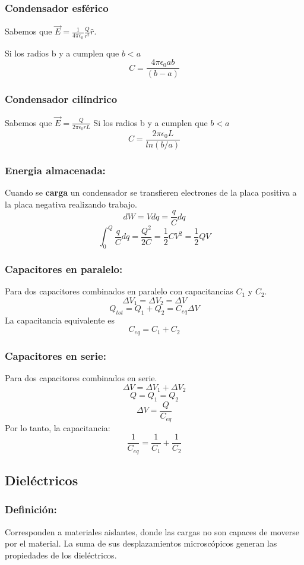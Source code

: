 \documentclass[a4paper, 10pt]{article}
\begin{document}
\begin{multicols*}{2}
	\subsubsection{Condensador esférico}
	Sabemos que $\vec{E} = \frac{1}{4 \pi \epsilon_0} \frac{Q}{r^2}\hat{r}$.

	Si los radios b y a cumplen que $b<a$
	$$C = \frac{4 \pi \epsilon_0 ab}{(b-a)}$$
	    
	\subsubsection{Condensador cilíndrico}
	Sabemos que $\vec{E} = \frac{Q}{2 \pi \epsilon_0 r L}$
	Si los radios b y a cumplen que $b<a$
	$$C = \frac{2 \pi \epsilon_0 L}{ln(b/a)}$$
	    
	\subsubsection{Energia almacenada:}  
  Cuando se \textbf{carga} un condensador se transfieren electrones de la placa positiva a la placa negativa realizando trabajo.
	$$dW = Vdq = \frac{q}{C}dq $$
	$$\int_0^Q \frac{q}{C}dq = \frac{Q^2}{2C} = \frac{1}{2}CV^2 = \frac{1}{2}QV$$
	    
	\subsubsection{Capacitores en paralelo:} Para dos capacitores combinados en paralelo con capacitancias $C_1$ y $C_2$.
	$$\Delta V_1 = \Delta V_2 = \Delta V$$
	$$Q_{tot} = Q_1 + Q_2 =C_{eq} \Delta V$$
	La capacitancia equivalente es
	$$C_{eq}=C_1 + C_2$$
	    
	\subsubsection{Capacitores en serie:} Para dos capacitores combinados en serie.
	$$\Delta V =\Delta V_1 + \Delta V_2 $$
	$$Q = Q_1 = Q_2$$
	$$\Delta V = \frac{Q}{C_{eq}}$$
	Por lo tanto, la capacitancia:
	$$ \frac{1}{C_{eq}} = \frac{1}{C_1}+\frac{1}{C_2}$$
	    
	    
	\subsection*{Dieléctricos}
	\subsubsection{Definición:} Corresponden a materiales aislantes, donde las cargas no son capaces de moverse por el material. La suma de sus desplazamientos microscópicos generan las propiedades de los dieléctricos.
	    

\end{multicols*}
\end{document}
